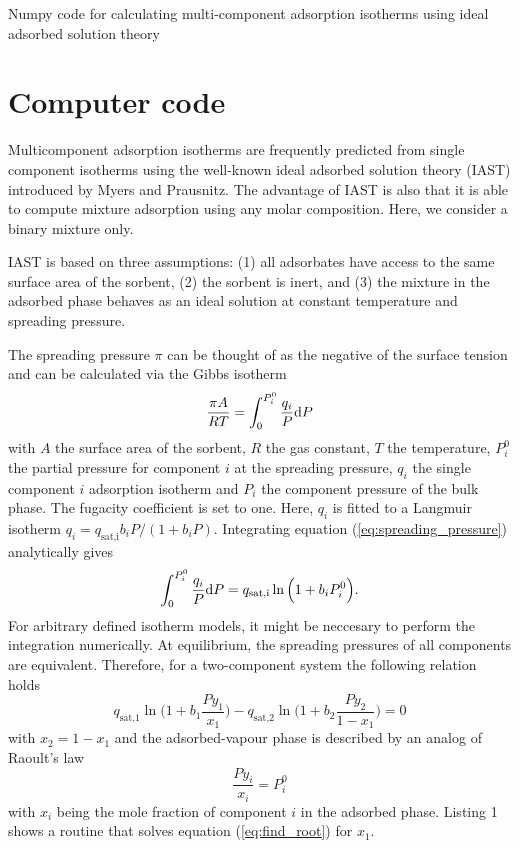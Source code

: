 \documentclass{article}
\begin{document}
\begin{center}
{\Large Numpy code for calculating multi-component adsorption isotherms using ideal adsorbed solution theory}
\end{center}
\section{Computer code}

Multicomponent adsorption isotherms are frequently predicted from single component isotherms using the well-known ideal adsorbed solution theory (IAST) introduced by Myers and Prausnitz.\cite{Myers1965} The advantage of IAST is also that it is able to compute mixture adsorption using any molar composition. Here, we consider a binary mixture only.

IAST is based on three assumptions: (1) all adsorbates have access to the same surface area of the sorbent, (2) the sorbent is inert, and (3) the mixture in the adsorbed phase behaves as an ideal solution at constant temperature and spreading pressure.

The spreading pressure $\pi$ can be thought of as the negative of the surface tension and can be calculated via the Gibbs isotherm\cite{Myers1965}
%
\begin{equation}
        \frac{{\pi}A}{RT} = \int_0^{P_i^0}\frac{q_i}{P} {\dif P}
	\label{eq:spreading_pressure}
\end{equation}
%
with $A$ the surface area of the sorbent, $R$ the gas constant, $T$ the temperature, $P_i^0$ the partial pressure for component $i$ at the spreading pressure, $q_i$ the single component $i$ adsorption isotherm and $P_i$ the component pressure of the bulk phase. The fugacity coefficient is set to one. Here, $q_i$ is fitted to a Langmuir isotherm $q_i = q_\text{sat,i}b_iP/(1+b_iP)$. Integrating equation (\ref{eq:spreading_pressure}) analytically gives
%
\begin{equation}
	\int_0^{P_i^0}\frac{q_i}{P} {\dif P} =  q_\text{sat,i}\ln\Big({1+b_iP_i^0}\Big). 
\end{equation}
%
For arbitrary defined isotherm models, it might be neccesary to perform the integration numerically. At equilibrium, the spreading pressures of all components are equivalent. Therefore, for a two-component system the following relation holds 
%
\begin{equation} 
	q_\text{sat,1}\ln{\Big(1+b_1\frac{Py_1}{x_1}\Big)} - q_\text{sat,2}\ln{\Big(1+b_2\frac{Py_2}{1-x_1}\Big)} = 0
	\label{eq:find_root}
\end{equation} 
%
with $x_2 = 1 - x_1$ and the adsorbed-vapour phase is described by an analog of Raoult's law 
%
\begin{equation}
        \frac{Py_i}{x_i} = P_i^0
\end{equation}
%
with $x_i$ being the mole fraction of component $i$ in the adsorbed phase. Listing 1 shows a routine that solves  equation (\ref{eq:find_root}) for $x_1$.
\end{document}
